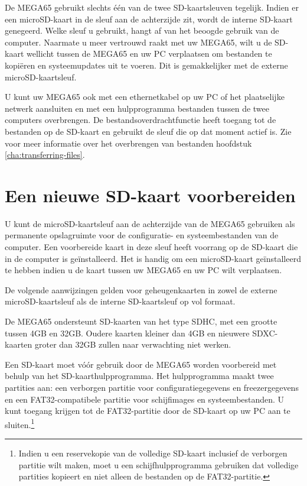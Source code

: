 De MEGA65 gebruikt slechts één van de twee SD-kaartsleuven tegelijk. Indien er een microSD-kaart in de sleuf aan de achterzijde zit, wordt de interne SD-kaart genegeerd. Welke sleuf u gebruikt, hangt af van het beoogde gebruik van de computer. Naarmate u meer vertrouwd raakt met uw MEGA65, wilt u de SD-kaart wellicht tussen de MEGA65 en uw PC verplaatsen om bestanden te kopiëren en systeemupdates uit te voeren. Dit is gemakkelijker met de externe microSD-kaartsleuf.

U kunt uw MEGA65 ook met een ethernetkabel op uw PC of het plaatselijke netwerk aansluiten en met een hulpprogramma bestanden tussen de twee computers overbrengen. De bestandsoverdrachtfunctie heeft toegang tot de bestanden op de SD-kaart en gebruikt de sleuf die op dat moment actief is. Zie voor meer informatie over het overbrengen van bestanden hoofdstuk \vref{cha:transferring-files}.

\section{Een nieuwe SD-kaart voorbereiden}

U kunt de microSD-kaartsleuf aan de achterzijde van de MEGA65 gebruiken als permanente opslagruimte voor de configuratie- en systeembestanden van de computer. Een voorbereide kaart in deze sleuf heeft voorrang op de SD-kaart die in de computer is geïnstalleerd. Het is handig om een microSD-kaart geïnstalleerd te hebben indien u de kaart tussen uw MEGA65 en uw PC wilt verplaatsen.

De volgende aanwijzingen gelden voor geheugenkaarten in zowel de externe microSD-kaartsleuf als de interne SD-kaartsleuf op vol formaat.

De MEGA65 ondersteunt SD-kaarten van het type SDHC, met een grootte tussen 4GB en 32GB. Oudere kaarten kleiner dan 4GB en nieuwere SDXC-kaarten groter dan 32GB zullen naar verwachting niet werken.

Een SD-kaart moet vóór gebruik door de MEGA65 worden voorbereid met behulp van het SD-kaarthulpprogramma. Het hulpprogramma maakt twee partities aan: een verborgen partitie voor configuratiegegevens en freezergegevens en een FAT32-compatibele partitie voor schijfimages en systeembestanden. U kunt toegang krijgen tot de FAT32-partitie door de SD-kaart op uw PC aan te sluiten.\footnote{Indien u een reservekopie van de volledige SD-kaart inclusief de verborgen partitie wilt maken, moet u een schijfhulpprogramma gebruiken dat volledige partities kopieert en niet alleen de bestanden op de FAT32-partitie.}

